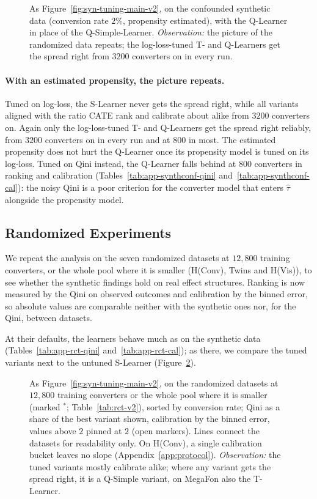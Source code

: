\documentclass{article}
\begin{document}
\begin{figure}[H]
\centering
{}
\caption{As Figure~\ref{fig:syn-tuning-main-v2}, on the confounded synthetic
data (conversion rate $2\%$, propensity estimated), with the Q-Learner in
place of the Q-Simple-Learner. \emph{Observation:} the picture of the
randomized data repeats; the log-loss-tuned T- and Q-Learners get the spread
right from $3200$ converters on in every run.}
\label{fig:syn-conf-v2}
\end{figure}

\paragraph{With an estimated propensity, the picture repeats.}
Tuned on log-loss, the S-Learner never gets the spread right, while all
variants aligned with the ratio CATE rank and calibrate about alike from
$3200$ converters on. Again only the log-loss-tuned T- and Q-Learners get the
spread right reliably, from $3200$ converters on in every run and at $800$ in
most. The estimated
propensity does not hurt the Q-Learner once its propensity model is tuned on
its log-loss. Tuned on Qini instead, the Q-Learner falls behind at $800$
converters in ranking and calibration (Tables~\ref{tab:app-synthconf-qini}
and~\ref{tab:app-synthconf-cal}): the noisy Qini is a poor criterion for
the converter model that enters $\hat\tau$ alongside the propensity model.

\subsection{Randomized Experiments}
\label{sec:rct-v2}
We repeat the analysis on the seven randomized datasets at $12{,}800$
training converters, or the whole pool where it is smaller (H(Conv), Twins
and H(Vis)), to see whether the synthetic findings hold on real effect
structures. Ranking is now measured
by the Qini on observed outcomes and calibration by the binned error, so absolute values
are comparable neither with the synthetic ones nor, for the Qini, between
datasets.

At their defaults, the learners behave much as on the synthetic data
(Tables~\ref{tab:app-rct-qini} and~\ref{tab:app-rct-cal}); as there, we
compare the tuned variants next to the untuned S-Learner
(Figure~\ref{fig:rct-tuning-max-v2}).

\begin{figure}[H]
\centering
{}
\caption{As Figure~\ref{fig:syn-tuning-main-v2}, on the randomized datasets
at $12{,}800$ training converters or the whole pool where it is smaller
(marked $^*$; Table~\ref{tab:rct-v2}), sorted by conversion rate; Qini as a
share of the best variant shown, calibration by the binned error, values
above $2$ pinned at $2$ (open markers). Lines connect the datasets for
readability only. On H(Conv), a single calibration bucket leaves no slope
(Appendix~\ref{app:protocol}). \emph{Observation:} the tuned variants
mostly calibrate alike; where any variant gets the spread right, it is a
Q-Simple variant, on MegaFon also the T-Learner.}
\label{fig:rct-tuning-max-v2}
\end{figure}
\end{document}
